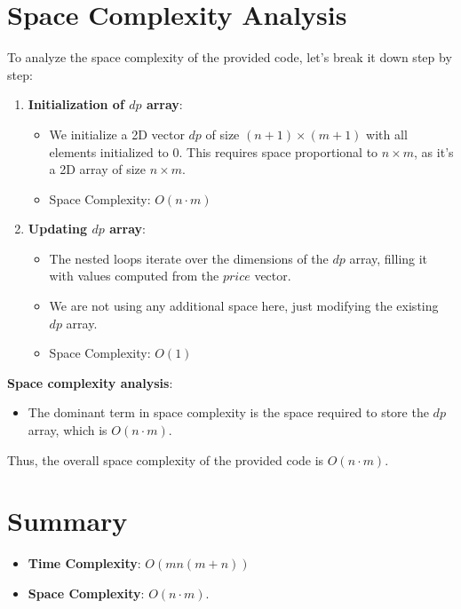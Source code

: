 \documentclass{article}
\begin{document}
{\section*{Space Complexity Analysis}

To analyze the space complexity of the provided code, let's break it down step by step:

\begin{enumerate}
    \item \textbf{Initialization of $dp$ array}: 
    \begin{itemize}
        \item We initialize a 2D vector $dp$ of size $(n+1) \times (m+1)$ with all elements initialized to $0$. This requires space proportional to $n \times m$, as it's a 2D array of size $n \times m$.
        \item Space Complexity: $O(n \cdot m)$
    \end{itemize}
    
    \item \textbf{Updating $dp$ array}:
    \begin{itemize}
        \item The nested loops iterate over the dimensions of the $dp$ array, filling it with values computed from the $price$ vector.
        \item We are not using any additional space here, just modifying the existing $dp$ array.
        \item Space Complexity: $O(1)$
    \end{itemize}
\end{enumerate}

\textbf{Space complexity analysis}:
\begin{itemize}
    \item The dominant term in space complexity is the space required to store the $dp$ array, which is $O(n \cdot m)$.
\end{itemize}

Thus, the overall space complexity of the provided code is $O(n \cdot m)$.

\section*{Summary}

\begin{itemize}
    \item \textbf{Time Complexity}: $O(mn(m + n))$
    \item \textbf{Space Complexity}: $O(n \cdot m)$.
\end{itemize}

}
\end{document}
